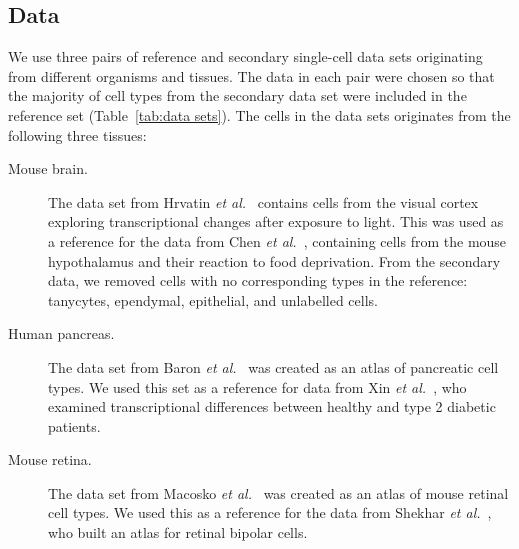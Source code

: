 \documentclass[runningheads]{llncs}
\newcommand{\etal}{\textit{et al.}}
\begin{document}
\subsection{Data}

We use three pairs of reference and secondary single-cell data sets originating
from different organisms and tissues. The data in each pair were chosen so that
the majority of cell types from the secondary data set were included in the
reference set (Table~\ref{tab:data sets}). The cells in the data sets
originates from the following three tissues:

\begin{description}
\item[Mouse brain.] The data set from Hrvatin \etal~\cite{hrvatin2018} contains
cells from the visual cortex exploring transcriptional changes after exposure
to light. This was used as a reference for the data from Chen
\etal~\cite{chen2017}, containing cells from the mouse hypothalamus and
their reaction to food deprivation. From the secondary data, we removed cells
with no corresponding types in the reference: tanycytes, ependymal,
epithelial, and unlabelled cells.

\item[Human pancreas.] The data set from Baron \etal~\cite{baron2016} was
created as an atlas of pancreatic cell types. We used this set as a reference
for data from Xin \etal~\cite{xin2016}, who examined transcriptional
differences between healthy and type 2 diabetic patients.

\item[Mouse retina.] The data set from Macosko \etal~\cite{macosko2015} was
created as an atlas of mouse retinal cell types. We used this as a reference
for the data from Shekhar \etal~\cite{shekhar2016}, who built an atlas for
retinal bipolar cells.
\end{description}
\end{document}
